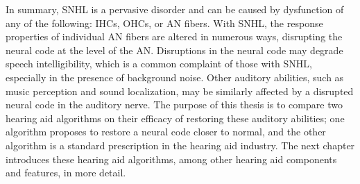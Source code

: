 In summary, SNHL is a pervasive disorder and can be caused by dysfunction of any of the following: IHCs, OHCs, or AN fibers.   With SNHL, the response properties of individual AN fibers are altered in numerous ways, disrupting the neural code at the level of the AN.  Disruptions in the neural code may degrade speech intelligibility, which is a common complaint of those with SNHL, especially in the presence of background noise.  Other auditory abilities, such as music perception and sound localization, may be similarly affected by a disrupted neural code in the auditory nerve.  The purpose of this thesis is to compare two hearing aid algorithms on their efficacy of restoring these auditory abilities; one algorithm proposes to restore a neural code closer to normal, and the other algorithm is a standard prescription in the hearing aid industry.  The next chapter introduces these hearing aid algorithms, among other hearing aid components and features, in more detail. 